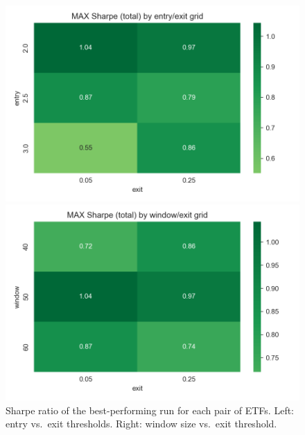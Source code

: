 \documentclass{article}
\begin{document}
\begin{figure}[htbp]
\centering
\begin{minipage}{0.48\textwidth}
  \centering
  \includegraphics[width=\linewidth]{heat_entry_exit_max.png}
\end{minipage}\hfill
\begin{minipage}{0.48\textwidth}
  \centering
  \includegraphics[width=\linewidth]{heat_window_exit_max.png}
\end{minipage}
\caption{Sharpe ratio of the best-performing run for each pair of ETFs. Left: entry vs.\ exit thresholds. Right: window size vs.\ exit threshold.}
\label{fig:heatmaps}
\end{figure}
\end{document}

